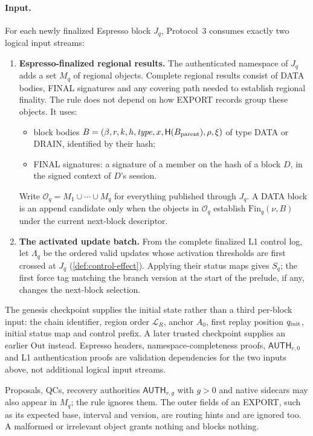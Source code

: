 \documentclass[11pt,a4paper]{article}
\newcommand{\Hash}{\mathsf H}
\newcommand{\tagg}[1]{\ensuremath{\mathsf{#1}}}
\begin{document}
\paragraph{Input.}
\label{sec:logical-carrier}
For each newly finalized Espresso block $J_q$, Protocol~3 consumes
exactly two logical input streams:
\begin{enumerate}[label=(I\arabic*),itemsep=2pt]
\item \textbf{Espresso-finalized regional results.}  The authenticated
namespace of $J_q$ adds a set $M_q$ of regional objects.  Complete
regional results consist of DATA bodies, FINAL signatures and any
covering path needed to establish regional finality.  The rule does not
depend on how EXPORT records group these objects.  It uses:
 \begin{itemize}[itemsep=1pt]
 \item block bodies
 $B=(\beta,r,k,h,\mathit{type},x,\Hash(B_{\rm parent}),\rho,\xi)$ of type
 DATA or DRAIN, identified by their hash;
 \item FINAL signatures: a signature of a member on the hash of a block
 $D$, in the signed context of $D$'s session.
 \end{itemize}
Write $\mathcal O_q=M_1\cup\cdots\cup M_q$ for everything published
through $J_q$. A DATA block is an append candidate only when the objects
in $\mathcal O_q$ establish $\mathrm{Fin}_q(\nu,B)$ under the current
next-block descriptor.
\item \textbf{The activated update batch.}  From the complete finalized
L1 control log, let $\Lambda_q$ be the ordered valid updates whose
activation thresholds are first crossed at $J_q$
(\cref{def:control-effect}).  Applying their status maps gives $S_q$;
the first force tag matching the branch version at the start of the
prelude, if any, changes the next-block selection.
\end{enumerate}
The genesis checkpoint supplies the initial state rather than a third
per-block input: the chain identifier, region order $\mathcal L_R$,
anchor $A_0$, first replay position $q_{\rm init}$, initial status map
and control prefix.  A later trusted checkpoint supplies an earlier
$\mathrm{Out}$ instead.  Espresso headers, namespace-completeness
proofs, $\tagg{AUTH}_{r,0}$ and L1 authentication proofs are validation
dependencies for the two inputs above, not additional logical input
streams.

Proposals, QCs, recovery authorities
$\tagg{AUTH}_{r,g}$ with $g>0$ and native sidecars may also appear in
$M_q$; the rule ignores them. The outer fields of an EXPORT, such as its
expected base, interval and version, are routing hints and are ignored
too. A malformed or irrelevant object grants nothing and blocks nothing.
\end{document}
